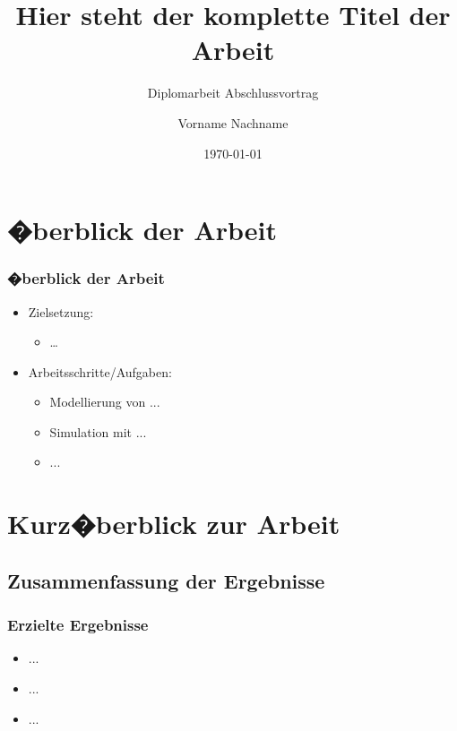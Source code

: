 \documentclass[
	10pt,
	t		%
]{beamer}
\title{Hier steht der komplette Titel der Arbeit}
\subtitle{Diplomarbeit Abschlussvortrag}
\author{Vorname Nachname}
\date{\today}
\begin{document}
\AddToShipoutPicture{\TitlePicture}
\maketitle
\ClearShipoutPicture
\AddToShipoutPicture{\BackgroundPicture}

\section{�berblick der Arbeit}
\begin{frame}
\frametitle{�berblick der Arbeit}
\begin{itemize}
\item Zielsetzung:
\begin{itemize}
\item \dots
\end{itemize}
\item Arbeitsschritte/Aufgaben:
\begin{itemize}
\item Modellierung von ...
\item Simulation mit ...
\item ...
\end{itemize}
\end{itemize}

\end{frame}
\section{Kurz�berblick zur Arbeit}
\subsection{Zusammenfassung der Ergebnisse}
\begin{frame}
\frametitle{Erzielte Ergebnisse}
\begin{itemize}
\item ...
\item ...
\item ...
\end{itemize}

\end{frame}
\end{document}
